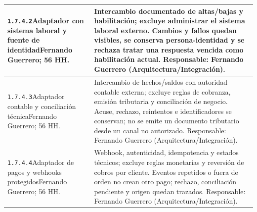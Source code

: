 \begin{longtable}{L{52mm}L{91mm}}
\texttt{1.\allowbreak{}7.\allowbreak{}4.\allowbreak{}2}\newline Adaptador con sistema laboral y fuente de identidad\newline Fernando Guerrero; 56 HH. & Intercambio documentado de altas/bajas y habilitación; excluye administrar el sistema laboral externo. Cambios y fallos quedan visibles, se conserva persona-identidad y se rechaza tratar una respuesta vencida como habilitación actual. Responsable: Fernando Guerrero (Arquitectura/Integración).\\\hline
\texttt{1.\allowbreak{}7.\allowbreak{}4.\allowbreak{}3}\newline Adaptador contable y conciliación técnica\newline Fernando Guerrero; 56 HH. & Intercambio de hechos/saldos con autoridad contable externa; excluye reglas de cobranza, emisión tributaria y conciliación de negocio. Acuse, rechazo, reintentos e identificadores se conservan; no se emite un documento tributario desde un canal no autorizado. Responsable: Fernando Guerrero (Arquitectura/Integración).\\\hline
\texttt{1.\allowbreak{}7.\allowbreak{}4.\allowbreak{}4}\newline Adaptador de pagos y webhooks protegidos\newline Fernando Guerrero; 56 HH. & Webhook, autenticidad, idempotencia y estados técnicos; excluye reglas monetarias y reversión de cobros por cliente. Eventos repetidos o fuera de orden no crean otro pago; rechazo, conciliación pendiente y origen quedan trazados. Responsable: Fernando Guerrero (Arquitectura/Integración).\\\hline
\end{longtable}
\endgroup
{}
